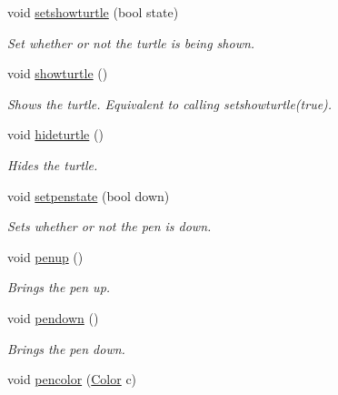 \begin{DoxyCompactItemize}
void \hyperlink{classcturtle_1_1Turtle_a9e83fdd5c469e4863cf9b460e4d29130}{setshowturtle} (bool state)
\begin{DoxyCompactList}\small\item\em Set whether or not the turtle is being shown. \end{DoxyCompactList}\item 
void \hyperlink{classcturtle_1_1Turtle_ac676ff53f6393c70d665053cab1d67c5}{showturtle} ()
\begin{DoxyCompactList}\small\item\em Shows the turtle. Equivalent to calling setshowturtle(true). \end{DoxyCompactList}\item 
void \hyperlink{classcturtle_1_1Turtle_a9703e6352bb71bb995ad0d364be66a49}{hideturtle} ()
\begin{DoxyCompactList}\small\item\em Hides the turtle. \end{DoxyCompactList}\item 
\mbox{\label{classcturtle_1_1Turtle_abaa5b7f8b659975bcfc9a787a93c123d}} 
void \hyperlink{classcturtle_1_1Turtle_abaa5b7f8b659975bcfc9a787a93c123d}{setpenstate} (bool down)
\begin{DoxyCompactList}\small\item\em Sets whether or not the pen is down. \end{DoxyCompactList}\item 
\mbox{\label{classcturtle_1_1Turtle_a2ee85233603aac7e5e6bd9ede80d2970}} 
void \hyperlink{classcturtle_1_1Turtle_a2ee85233603aac7e5e6bd9ede80d2970}{penup} ()
\begin{DoxyCompactList}\small\item\em Brings the pen up. \end{DoxyCompactList}\item 
\mbox{\label{classcturtle_1_1Turtle_a8256411dae140f1e09058afecf7e6e8e}} 
void \hyperlink{classcturtle_1_1Turtle_a8256411dae140f1e09058afecf7e6e8e}{pendown} ()
\begin{DoxyCompactList}\small\item\em Brings the pen down. \end{DoxyCompactList}\item 
void \hyperlink{classcturtle_1_1Turtle_a9fb220cdbffecdaaa8f8a722ef624eb8}{pencolor} (\hyperlink{classcturtle_1_1Color}{Color} c)

\end{DoxyCompactItemize}
